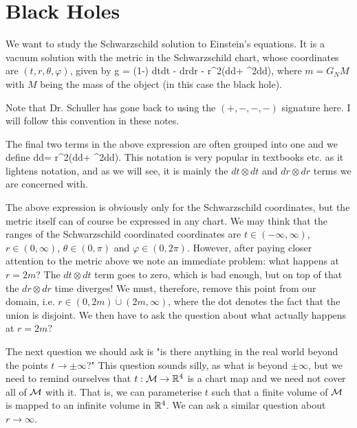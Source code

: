\chapter{Black Holes}

We want to study the Schwarzschild solution to Einstein's equations. It is a vacuum solution with the metric in the Schwarzschild chart, whose coordinates are $(t,r,\theta,\varphi)$, given by
\bse 
    g = \bigg(1-\bigg) dt\otimes dt - dr\otimes dr - r^2\big(d\theta\otimes d\theta + \sin^2\theta d\varphi\otimes d\varphi\big),
\ese 
where $m= G_NM$ with $M$ being the mass of the object (in this case the black hole). 

\br 
    Note that Dr. Schuller has gone back to using the $(+,-,-,-)$ signature here. I will follow this convention in these notes.
\er 

\bnn 
    The final two terms in the above expression are often grouped into one and we define 
    \bse 
        d\Omega\otimes d\Omega = r^2\big(d\theta\otimes d\theta + \sin^2\theta d\varphi\otimes d\varphi\big).
    \ese 
    This notation is very popular in textbooks etc. as it lightens notation, and as we will see, it is mainly the $dt\otimes dt$ and $dr\otimes dr$ terms we are concerned with. 
\enn
 
The above expression is obviously only for the Schwarzschild coordinates, but the metric itself can of course be expressed in any chart. We may think that the ranges of the Schwarzschild coordinated coordinates are $t\in(-\infty,\infty)$, $r\in(0,\infty)$, $\theta\in(0,\pi)$ and $\varphi\in(0,2\pi)$. However, after paying closer attention to the metric above we note an immediate problem: what happens at $r=2m$? The $dt\otimes dt$ term goes to zero, which is bad enough, but on top of that the $dr\otimes dr$ time diverges! We must, therefore, remove this point from our domain, i.e. $r\in(0,2m)\dot{\cup}(2m,\infty)$, where the dot denotes the fact that the union is disjoint. We then have to ask the question about what actually happens at $r=2m?$

The next question we should ask is "is there anything in the real world beyond the points $t\to\pm\infty$?" This question sounds silly, as what is beyond $\pm\infty$, but we need to remind ourselves that $t:\mathcal{M}\to\mathbb{R}^4$ is a chart map and we need not cover all of $\mathcal{M}$ with it. That is, we can parameterise $t$ such that a finite volume of $\mathcal{M}$ is mapped to an infinite volume in $\mathbb{R}^4$. We can ask a similar question about $r\to\infty$.


